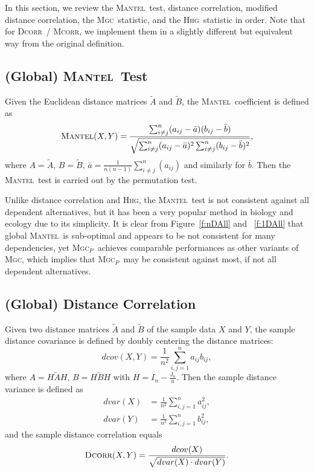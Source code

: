 \documentclass[11pt]{article}
\providecommand{\sct}[1]{{\normalfont\textsc{#1}}}
\newcommand{\Mgc}{\sct{Mgc}}
\newcommand{\Mgcp}{\sct{Mgc$_P$}}
\newcommand{\Hhg}{\sct{Hhg}}
\newcommand{\Dcorr}{\sct{Dcorr}}
\newcommand{\Mcorr}{\sct{Mcorr}}
\newcommand{\Mantel}{\sct{Mantel}}
\begin{document}
In this section, we review the \Mantel~test, distance correlation, modified distance correlation, the \Mgc~statistic, and the \Hhg~statistic in order. Note that for \Dcorr~/ \Mcorr, we implement them in a slightly different but equivalent way from the original definition.

\subsection{(Global) \Mantel~Test}
\label{appen:mantel}
Given the Euclidean distance matrices $\tilde{A}$ and $\tilde{B}$, the \Mantel~coefficient \cite{Mantel1967} is defined as
\begin{equation*}
\Mantel(X,Y)=\frac{\sum_{i \neq j}^{n}(a_{ij}-\bar{a})(b_{ij}-\bar{b})}{\sqrt{\sum_{i \neq j}^{n}(a_{ij}-\bar{a})^2 \sum_{i \neq j}^{n}(b_{ij}-\bar{b})^2}},
\end{equation*}
where $A=\tilde{A}$, $B=\tilde{B}$, $\bar{a}=\frac{1}{n(n-1)}\sum_{i \neq j}^{n}(a_{ij})$ and similarly for $\bar{b}$. Then the \Mantel~test is carried out by the permutation test.

Unlike distance correlation and \Hhg, the \Mantel~test is not consistent against all dependent alternatives, but it has been a very popular method in biology and ecology due to its simplicity. It is clear from Figure~\ref{f:nDAll} and ~\ref{f:1DAll} that global \Mantel~is sub-optimal and appears to be not consistent for many dependencies, yet \Mgcp~achieves comparable performances as other variants of \Mgc, which implies that \Mgcp~may be consistent against most, if not all dependent alternatives.

\subsection{(Global) Distance Correlation}
\label{appen:dcorr}
Given two distance matrices $\tilde{A}$ and $\tilde{B}$ of the sample data $X$ and $Y$, the sample distance covariance is defined by doubly centering the distance matrices:
\begin{equation*}
\label{dcovEqu}
dcov(X,Y)=\frac{1}{n^2}\sum_{i,j=1}^{n}a_{ij}b_{ij},
\end{equation*}
where $A=H\tilde{A}H$, $B=H\tilde{B}H$ with $H=I_{n}-\frac{J_{n}}{n}$. Then the sample distance variance is defined as
\begin{align*}
dvar(X) &=\frac{1}{n^2}\sum_{i,j=1}^{n}a_{ij}^{2},\\
dvar(Y) &=\frac{1}{n^2}\sum_{i,j=1}^{n}b_{ij}^{2},
\end{align*}
and the sample distance correlation equals
\begin{equation*}
\Dcorr(X,Y)=\frac{dcov(X)}{\sqrt{dvar(X) \cdot dvar(Y)}}.
\end{equation*}
\end{document}
